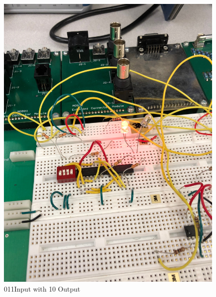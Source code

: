 \documentclass[10pt]{article}
\begin{document}
\begin{centering}
	\begin{figure} [H]
		\centering
		\includegraphics[scale=0.07]{images/011led.jpg}
		\caption{011Input with 10 Output}
	\end{figure}
\end{centering}
\end{document}
